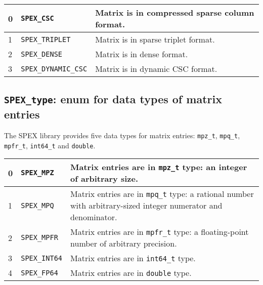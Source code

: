 \documentclass[12pt,oneside]{book}
\theoremstyle{definition}
\newenvironment{SizedCenteredTabular}[2][\small]
    {   
        #1\begin{center}\begin{tabular}{#2}
    }{ 
        \end{tabular}\end{center}
    }
\begin{document}
\begin{SizedCenteredTabular}{llp{4in}} \hline
        0 & \verb|SPEX_CSC| & Matrix is in compressed sparse column format. \\ \hline
        1 & \verb|SPEX_TRIPLET|      & Matrix is in sparse triplet format. \\ \hline
        2 & \verb|SPEX_DENSE|        & Matrix is in dense format.\\ \hline
        3 & \verb|SPEX_DYNAMIC_CSC| & Matrix is in dynamic CSC format. \\ \hline
\end{SizedCenteredTabular}


\subsection{\texttt{SPEX\_type}: enum for data types of matrix entries}
\label{ss:SPEX_type}
The SPEX library provides five data types for matrix entries: \verb|mpz_t|,
\verb|mpq_t|, \verb|mpfr_t|, \verb|int64_t| and \verb|double|.

\begin{SizedCenteredTabular}{llp{4in}} \hline
    0 & \verb|SPEX_MPZ|     & Matrix entries are in \verb|mpz_t| type: an integer
                              of arbitrary size. \\ \hline
    1 & \verb|SPEX_MPQ|     & Matrix entries are in \verb|mpq_t| type: a rational
                              number with arbitrary-sized integer numerator and
                              denominator. \\ \hline
    2 & \verb|SPEX_MPFR|    & Matrix entries are in \verb|mpfr_t| type: a
                              floating-point number of arbitrary precision. \\ \hline
    3 & \verb|SPEX_INT64|   & Matrix entries are in \verb|int64_t| type. \\ \hline
    4 & \verb|SPEX_FP64|    & Matrix entries are in \verb|double| type. \\ \hline
\end{SizedCenteredTabular}


\end{document}
